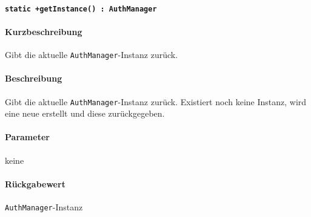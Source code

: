 \paragraph{\texttt{static +getInstance() : AuthManager}}%
\paragraph*{Kurzbeschreibung}
Gibt die aktuelle \verb#AuthManager#-Instanz zurück.
\paragraph*{Beschreibung}
Gibt die aktuelle \verb#AuthManager#-Instanz zurück.
Existiert noch keine Instanz, wird eine neue erstellt und diese zurückgegeben.
\paragraph*{Parameter}
keine
\paragraph*{Rückgabewert}
\verb#AuthManager#-Instanz